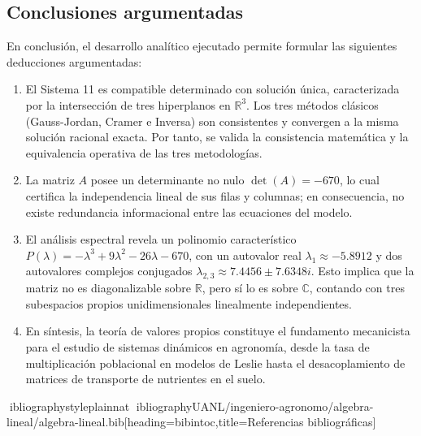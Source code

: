 \documentclass[spanish,letterpaper,oneside]{article}
\begin{document}
\subsection{Conclusiones argumentadas}
En conclusión, el desarrollo analítico ejecutado permite formular las siguientes deducciones argumentadas:
\begin{enumerate}
\item El Sistema 11 es compatible determinado con solución única, caracterizada por la intersección de tres hiperplanos en $\mathbb{R}^3$. Los tres métodos clásicos (Gauss-Jordan, Cramer e Inversa) son consistentes y convergen a la misma solución racional exacta. Por tanto, se valida la consistencia matemática y la equivalencia operativa de las tres metodologías.
\item La matriz $A$ posee un determinante no nulo $\det(A) = -670$, lo cual certifica la independencia lineal de sus filas y columnas; en consecuencia, no existe redundancia informacional entre las ecuaciones del modelo.
\item El análisis espectral revela un polinomio característico $P(\lambda) = -\lambda^3 + 9\lambda^2 - 26\lambda - 670$, con un autovalor real $\lambda_1 \approx -5.8912$ y dos autovalores complejos conjugados $\lambda_{2,3} \approx 7.4456 \pm 7.6348i$. Esto implica que la matriz no es diagonalizable sobre $\mathbb{R}$, pero sí lo es sobre $\mathbb{C}$, contando con tres subespacios propios unidimensionales linealmente independientes.
\item En síntesis, la teoría de valores propios constituye el fundamento mecanicista para el estudio de sistemas dinámicos en agronomía, desde la tasa de multiplicación poblacional en modelos de Leslie hasta el desacoplamiento de matrices de transporte de nutrientes en el suelo.
\end{enumerate}

\clearpage
ibliographystyle{plainnat}
ibliography{UANL/ingeniero-agronomo/algebra-lineal/algebra-lineal.bib}[heading=bibintoc,title={Referencias bibliográficas}]
\end{document}
